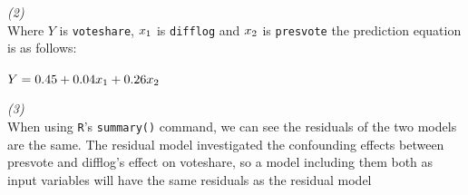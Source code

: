 \documentclass[12pt,letterpaper]{article}
\begin{document}
\textit{(2)}\\ 

\noindent Where $Y$ is \texttt{voteshare}, $x\textsubscript{1}$ is \texttt{difflog} and $x\textsubscript{2}$ is \texttt{presvote} the prediction equation is as follows:

$Y = 0.45 + 0.04x\textsubscript{1} + 0.26x\textsubscript{2}$
\vspace{.25cm}

\textit{(3)}\\ 

\noindent When using \texttt{R}'s \texttt{summary()} command, we can see the residuals of the two models are the same. The residual model investigated the confounding effects between presvote and difflog's effect on voteshare, so a model including them both as input variables will have the same residuals as the residual model
\end{document}
